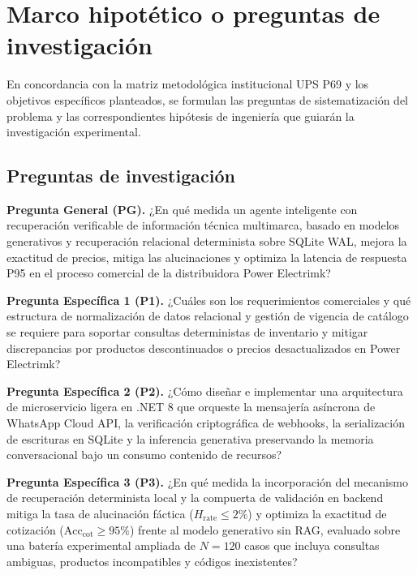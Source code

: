 \section{Marco hipotético o preguntas de investigación}

En concordancia con la matriz metodológica institucional UPS P69 y los objetivos específicos planteados, se formulan las preguntas de sistematización del problema y las correspondientes hipótesis de ingeniería que guiarán la investigación experimental.

\subsection{Preguntas de investigación}

\noindent\textbf{Pregunta General (PG).} ¿En qué medida un agente inteligente con recuperación verificable de información técnica multimarca, basado en modelos generativos y recuperación relacional determinista sobre SQLite WAL, mejora la exactitud de precios, mitiga las alucinaciones y optimiza la latencia de respuesta P95 en el proceso comercial de la distribuidora Power Electrimk?

\vspace{0.3cm}
\noindent\textbf{Pregunta Específica 1 (P1).} ¿Cuáles son los requerimientos comerciales y qué estructura de normalización de datos relacional y gestión de vigencia de catálogo se requiere para soportar consultas deterministas de inventario y mitigar discrepancias por productos descontinuados o precios desactualizados en Power Electrimk?

\vspace{0.3cm}
\noindent\textbf{Pregunta Específica 2 (P2).} ¿Cómo diseñar e implementar una arquitectura de microservicio ligera en .NET 8 que orqueste la mensajería asíncrona de WhatsApp Cloud API, la verificación criptográfica de webhooks, la serialización de escrituras en SQLite y la inferencia generativa preservando la memoria conversacional bajo un consumo contenido de recursos?

\vspace{0.3cm}
\noindent\textbf{Pregunta Específica 3 (P3).} ¿En qué medida la incorporación del mecanismo de recuperación determinista local y la compuerta de validación en backend mitiga la tasa de alucinación fáctica ($H_{\text{rate}} \le 2\%$) y optimiza la exactitud de cotización ($\text{Acc}_{\text{cot}} \ge 95\%$) frente al modelo generativo sin RAG, evaluado sobre una batería experimental ampliada de $N = 120$ casos que incluya consultas ambiguas, productos incompatibles y códigos inexistentes?

